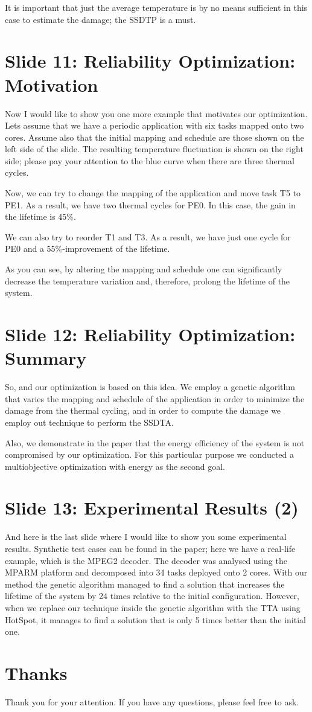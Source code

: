 \documentclass[11pt,a4paper]{article}
\begin{document}
It is important that just the average temperature is by no means sufficient in this case to estimate the damage; the SSDTP is a must.

\section{Slide 11: Reliability Optimization: Motivation}
Now I would like to show you one more example that motivates our optimization. Lets assume that we have a periodic application with six tasks mapped onto two cores. Assume also that the initial mapping and schedule are those shown on the left side of the slide. The resulting temperature fluctuation is shown on the right side; please pay your attention to the blue curve when there are three thermal cycles.

Now, we can try to change the mapping of the application and move task T5 to PE1. As a result, we have two thermal cycles for PE0. In this case, the gain in the lifetime is 45\%.

We can also try to reorder T1 and T3. As a result, we have just one cycle for PE0 and a 55\%-improvement of the lifetime.

As you can see, by altering the mapping and schedule one can significantly decrease the temperature variation and, therefore, prolong the lifetime of the system.

\section{Slide 12: Reliability Optimization: Summary}
So, and our optimization is based on this idea. We employ a genetic algorithm that varies the mapping and schedule of the application in order to minimize the damage from the thermal cycling, and in order to compute the damage we employ out technique to perform the SSDTA.

Also, we demonstrate in the paper that the energy efficiency of the system is not compromised by our optimization. For this particular purpose we conducted a multiobjective optimization with energy as the second goal.

\section{Slide 13: Experimental Results (2)}
And here is the last slide where I would like to show you some experimental results. Synthetic test cases can be found in the paper; here we have a real-life example, which is the MPEG2 decoder. The decoder was analysed using the MPARM platform and decomposed into 34 tasks deployed onto 2 cores. With our method the genetic algorithm managed to find a solution that increases the lifetime of the system by 24 times relative to the initial configuration. However, when we replace our technique inside the genetic algorithm with the TTA using HotSpot, it manages to find a solution that is only 5 times better than the initial one.

\section{Thanks}
Thank you for your attention. If you have any questions, please feel free to ask.
\end{document}
